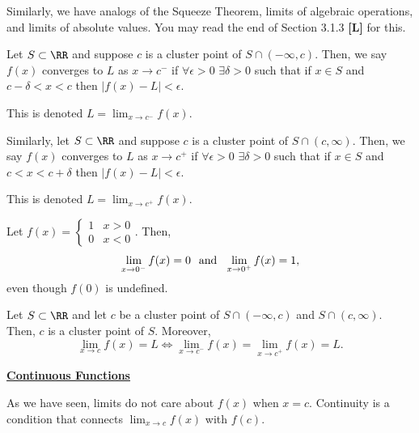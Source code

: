 Similarly, we have analogs of the Squeeze Theorem, limits of algebraic operations, and limits of absolute values. You may read the end of Section 3.1.3 \textbf{[L]} for this.

\begin{definition}
Let $S\subset \RR$ and suppose $c$ is a cluster point of $S\cap (-\infty, c)$. Then, we say $f(x)$ converges to $L$ as $x\to c^{-}$ if $\forall \epsilon>0$ $\exists \delta >0$ such that if $x\in S$ and $c-\delta < x< c$ then $|f(x) -L|<\epsilon$.
\end{definition}

\begin{notation}
This is denoted $L = \lim_{x\to c^-} f(x)$.
\end{notation}

\begin{definition}
Similarly, let $S\subset \RR$ and suppose $c$ is a cluster point of $S\cap (c,\infty)$. Then, we say $f(x)$ converges to $L$ as $x\to c^{+}$ if $\forall \epsilon>0$ $\exists \delta >0$ such that if $x\in S$ and $c < x< c+\delta$ then $|f(x) -L|<\epsilon$.
\end{definition}

\begin{notation}
This is denoted $L = \lim_{x\to c^+} f(x)$.
\end{notation}

\begin{example}
Let $f(x) = \begin{cases}1 & x>0 \\ 0 & x< 0\end{cases}$. Then, 
\[
\lim_{x\to 0^-} f(x) = 0 \hspace{.25cm} \text{and} \hspace{.25cm} \lim_{x\to 0^+} f(x) = 1,
\]
even though $f(0)$ is undefined.
\end{example}

\begin{theorem}
Let $S\subset \RR$ and let $c$ be a cluster point of $S\cap (-\infty, c)$ and $S\cap (c,\infty)$. Then, $c$ is a cluster point of $S$. Moreover, 
\[
\lim_{x\to c} f(x) = L \iff \lim_{x\to c^-}f(x) = \lim_{x\to c^+} f(x) = L.
\]
\end{theorem}

\noindent\underline{\textbf{Continuous Functions}}

As we have seen, limits do not care about $f(x)$ when $x = c$. Continuity is a condition that connects $\lim_{x\to c} f(x)$ with $f(c)$.

